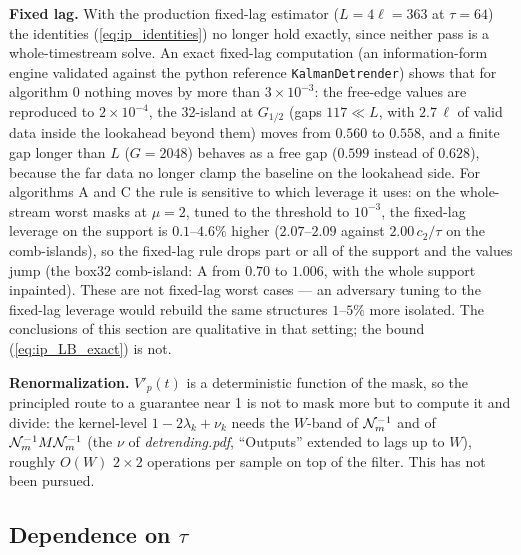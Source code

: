 \documentclass{article}
\numberwithin{equation}{section}   %
\newcommand{\dtnotes}[1]{{\em detrending.pdf}, ``#1''}
\begin{document}
{\bf Fixed lag.}  With the production fixed-lag estimator ($L = 4\ell = 363$ at $\tau = 64$) the
identities (\ref{eq:ip_identities}) no longer hold exactly, since neither pass is a whole-timestream
solve.  An exact fixed-lag computation (an information-form engine validated against the python reference
{\tt KalmanDetrender}) shows that for algorithm 0 nothing moves by more than $3 \times 10^{-3}$: the
free-edge values are reproduced to $2 \times 10^{-4}$, the 32-island at $G_{1/2}$ (gaps $117 \ll L$,
with $2.7\,\ell$ of valid data inside the lookahead beyond them) moves from $0.560$ to $0.558$, and a
finite gap longer than $L$ ($G = 2048$) behaves as a free gap ($0.599$ instead of $0.628$), because the
far data no longer clamp the baseline on the lookahead side.  For algorithms A and C the rule is
sensitive to which leverage it uses: on the whole-stream worst masks at $\mu = 2$, tuned to the
threshold to $10^{-3}$, the fixed-lag leverage on the support is $0.1$--$4.6\%$ higher ($2.07$--$2.09$
against $2.00\,c_2/\tau$ on the comb-islands), so the fixed-lag rule drops part or all of the support
and the values jump (the box32 comb-island: A from $0.70$ to $1.006$, with the whole support inpainted).
These are not fixed-lag worst cases --- an adversary tuning to the fixed-lag leverage would rebuild the
same structures $1$--$5\%$ more isolated.  The conclusions of this section are qualitative in that
setting; the bound (\ref{eq:ip_LB_exact}) is not.

{\bf Renormalization.}  $V'_p(t)$ is a deterministic function of the mask, so the principled route to a
guarantee near 1 is not to mask more but to compute it and divide: the kernel-level
$1 - 2\lambda_k + \nu_k$ needs the $W$-band of ${\cal N}_m^{-1}$ and of ${\cal N}_m^{-1}M{\cal N}_m^{-1}$
(the $\nu$ of \dtnotes{Outputs} extended to lags up to $W$), roughly $O(W)$ $2 \times 2$ operations per
sample on top of the filter.  This has not been pursued.

\subsection{Dependence on $\tau$}
\label{sec:ip_tau}
\end{document}
